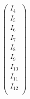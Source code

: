 \begin{equation}
\begin{pmatrix}
              I_4 \\
              I_5 \\
              I_6 \\
              I_7 \\
              I_8 \\
              I_9 \\
              I_10 \\
              I_11 \\
              I_12 \\
            \end{pmatrix}
            \label{unsere_matrix}
          \end{equation}

           

